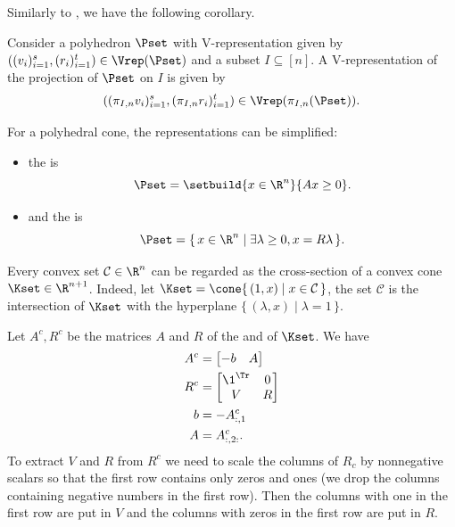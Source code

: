 \documentclass[11pt,twoside,a4paper,openright]{uclouvain-thesis}
\newcommand{\Cset}{\mathcal{C}}
\begin{document}
Similarly to , we have the following corollary.
\begin{mycoro}
  \label{coro:polyproj}
  Consider a polyhedron $\Pset$ with V-representation given by
  $((v_i)_{i=1}^s, (r_i)_{i=1}^t) \in \Vrep(\Pset)$
  and a subset $I \subseteq [n]$.
  A V-representation of the projection of $\Pset$ on $I$ is given by
  \begin{equation*}
    ((\pi_{I, n}v_i)_{i=1}^s, (\pi_{I, n}r_i)_{i=1}^t) \in \Vrep(\pi_{I, n}(\Pset)).
  \end{equation*}
\end{mycoro}

For a polyhedral cone, the representations can be simplified:
\begin{itemize}
  \item the \hrep{} is
    \begin{equation}
      \label{eq:coneHrep}
      \Pset = \setbuild{x \in \R^n}{Ax \geq 0}.
    \end{equation}
  \item and the \emph{\rrep} is
    \begin{equation}
      \label{eq:coneVrep}
      \Pset = \{\, x \in \R^n \mid \exists \lambda \geq 0, x = R\lambda \,\}.
    \end{equation}
\end{itemize}

Every convex set $\Cset \in \R^n$ can be regarded as the cross-section of a convex cone $\Kset \in \R^{n+1}$.
Indeed, let $\Kset = \cone\{\, (1,x) \mid x \in \Cset \,\}$,
the set $\Cset$ is the intersection of $\Kset$ with the hyperplane $\{\, (\lambda,x) \mid \lambda = 1\,\}$.

Let $A^c, R^c$ be the matrices $A$ and $R$ of the \hrep{} and \rrep{} of $\Kset$.
We have
\begin{align*}
  A^c & = \begin{bmatrix}-b & A\end{bmatrix}\\
  R^c & = \begin{bmatrix}\1^\Tr & 0\\V & R\end{bmatrix}\\
  b & = -A^c_{:,1}\\
  A & = A^c_{:,2:}.
\end{align*}
To extract $V$ and $R$ from $R^c$ we need to scale the columns of $R_c$ by nonnegative scalars so that the first row contains only zeros and ones (we drop the columns containing negative numbers in the first row).
Then the columns with one in the first row are put in $V$ and the columns with zeros in the first row are put in $R$.
\end{document}
